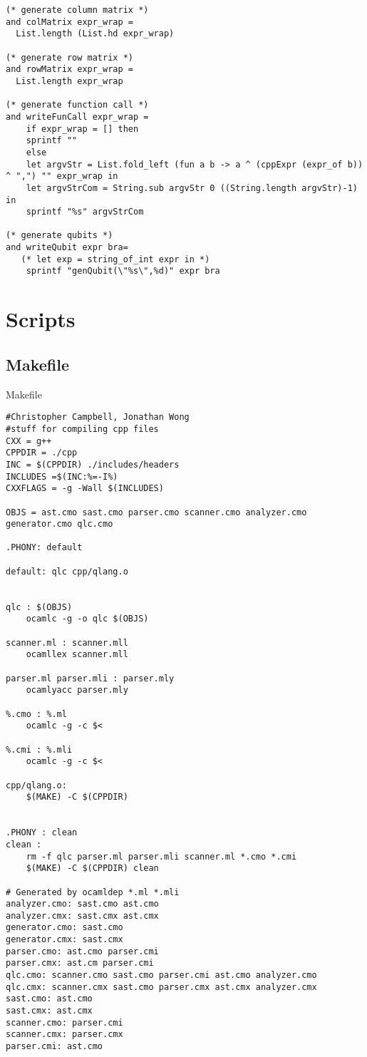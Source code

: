 \begin{lstlisting}
(* generate column matrix *)
and colMatrix expr_wrap =
  List.length (List.hd expr_wrap)

(* generate row matrix *)
and rowMatrix expr_wrap =
  List.length expr_wrap

(* generate function call *)
and writeFunCall expr_wrap =
    if expr_wrap = [] then
    sprintf ""
    else
    let argvStr = List.fold_left (fun a b -> a ^ (cppExpr (expr_of b)) ^ ",") "" expr_wrap in
    let argvStrCom = String.sub argvStr 0 ((String.length argvStr)-1) in
    sprintf "%s" argvStrCom

(* generate qubits *)
and writeQubit expr bra=
   (* let exp = string_of_int expr in *)
    sprintf "genQubit(\"%s\",%d)" expr bra
\end{lstlisting}


\section{Scripts}


\subsection{Makefile}
Makefile    
\begin{lstlisting}
#Christopher Campbell, Jonathan Wong
#stuff for compiling cpp files
CXX = g++
CPPDIR = ./cpp
INC = $(CPPDIR) ./includes/headers
INCLUDES =$(INC:%=-I%)
CXXFLAGS = -g -Wall $(INCLUDES)

OBJS = ast.cmo sast.cmo parser.cmo scanner.cmo analyzer.cmo generator.cmo qlc.cmo

.PHONY: default

default: qlc cpp/qlang.o


qlc : $(OBJS) 
	ocamlc -g -o qlc $(OBJS)

scanner.ml : scanner.mll
	ocamllex scanner.mll

parser.ml parser.mli : parser.mly
	ocamlyacc parser.mly

%.cmo : %.ml
	ocamlc -g -c $<

%.cmi : %.mli
	ocamlc -g -c $<

cpp/qlang.o:
	$(MAKE) -C $(CPPDIR)


.PHONY : clean
clean :
	rm -f qlc parser.ml parser.mli scanner.ml *.cmo *.cmi
	$(MAKE) -C $(CPPDIR) clean

# Generated by ocamldep *.ml *.mli
analyzer.cmo: sast.cmo ast.cmo
analyzer.cmx: sast.cmx ast.cmx
generator.cmo: sast.cmo
generator.cmx: sast.cmx
parser.cmo: ast.cmo parser.cmi 
parser.cmx: ast.cm parser.cmi 
qlc.cmo: scanner.cmo sast.cmo parser.cmi ast.cmo analyzer.cmo
qlc.cmx: scanner.cmx sast.cmo parser.cmx ast.cmx analyzer.cmx
sast.cmo: ast.cmo
sast.cmx: ast.cmx
scanner.cmo: parser.cmi 
scanner.cmx: parser.cmx 
parser.cmi: ast.cmo
\end{lstlisting}

